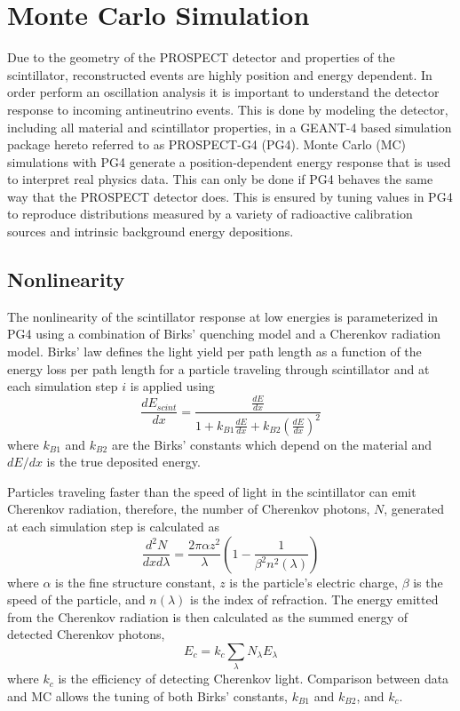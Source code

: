 \section{Monte Carlo Simulation}

Due to the geometry of the PROSPECT detector and properties of the scintillator, reconstructed events are highly position and energy dependent. 
In order perform an oscillation analysis it is important to understand the detector response to incoming antineutrino events. 
This is done by modeling the detector, including all material and scintillator properties, in a GEANT-4 based simulation package hereto referred to as PROSPECT-G4 (PG4).
Monte Carlo (MC) simulations with PG4 generate a position-dependent energy response that is used to interpret real physics data. 
This can only be done if PG4 behaves the same way that the PROSPECT detector does. 
This is ensured by tuning values in PG4 to reproduce distributions measured by a variety of radioactive calibration sources and intrinsic background energy depositions.

\subsection{Nonlinearity}

The nonlinearity of the scintillator response at low energies is parameterized in PG4 using a combination of Birks' quenching model \cite{BIRKS1964269} and a Cherenkov radiation model.
Birks' law defines the light yield per path length as a function of the energy loss per path length for a particle traveling through scintillator and at each simulation step $i$ is applied using
\begin{equation}
	\frac{dE_{scint}}{dx} = \frac{\frac{dE}{dx}}{1 + k_{B1}\frac{dE}{dx} + k_{B2}\left(\frac{dE}{dx}\right)^2}
\end{equation}
where $k_{B1}$ and $k_{B2}$ are the Birks' constants which depend on the material and $dE/dx$ is the true deposited energy.

Particles traveling faster than the speed of light in the scintillator can emit Cherenkov radiation, therefore, the number of Cherenkov photons, $N$, generated at each simulation step is calculated as
\begin{equation}
	\frac{d^2N}{dxd\lambda} = \frac{2\pi \alpha z^2}{\lambda}\left(1-\frac{1}{\beta^2n^2(\lambda)}\right)
\end{equation}
where $\alpha$ is the fine structure constant, $z$ is the particle's electric charge, $\beta$ is the speed of the particle, and $n(\lambda)$ is the index of refraction.
The energy emitted from the Cherenkov radiation is then calculated as the summed energy of detected Cherenkov photons,
\begin{equation}
	E_c = k_c \sum_{\lambda}N_\lambda E_\lambda
\end{equation}
where $k_c$ is the efficiency of detecting Cherenkov light. 
Comparison between data and MC allows the tuning of both Birks' constants, $k_{B1}$ and $k_{B2}$, and $k_c$.

